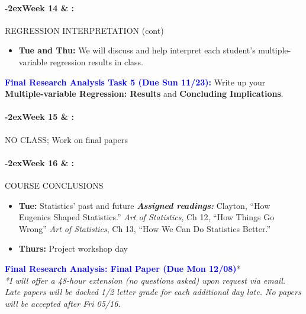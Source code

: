 \documentclass[11pt]{article}
\newcommand{\week}[1]{

  \paragraph*{\kern-2ex\quad #1 \AdvanceDate[1]\syldate{\today} \& \AdvanceDate[2]\syldate{\today} :}

  \ifdim\wd1=\wd\MONDAY
    \AdvanceDate[7]
  \else
    \AdvanceDate[7]
  \fi
}
\begin{document}
\week{Week 14} REGRESSION INTERPRETATION (cont)

\begin{itemize}
    \item []\textbf{Tue and Thu:} We will discuss and help interpret each student's multiple-variable regression results in class.
\end{itemize}

\noindent \textcolor{blue}{\textbf{Final Research Analysis Task 5 (Due Sun 11/23):}} Write up your \textbf{Multiple-variable Regression: Results} and \textbf{Concluding Implications}.

\week{Week 15} NO CLASS; Work on final papers

\week{Week 16} COURSE CONCLUSIONS
\begin{itemize}
    \item[] \textbf{Tue:} Statistics' past and future
        \subitem \textbf{\textit{Assigned readings:}}
        \subsubitem Clayton, ``How Eugenics Shaped Statistics.''
        \subsubitem \textit{Art of Statistics}, Ch 12, ``How Things Go Wrong''
        \subsubitem \textit{Art of Statistics}, Ch 13, ``How We Can Do Statistics Better.''

    \item[] \textbf{Thurs:} Project workshop day
\end{itemize}

\noindent \textcolor{blue}{\textbf{Final Research Analysis: Final Paper (Due Mon 12/08)}}*\\
\textit{*I will offer a 48-hour extension (no questions asked) upon request via email. Late papers will be docked 1/2 letter grade for each additional day late. No papers will be accepted after Fri 05/16.}
\end{document}
